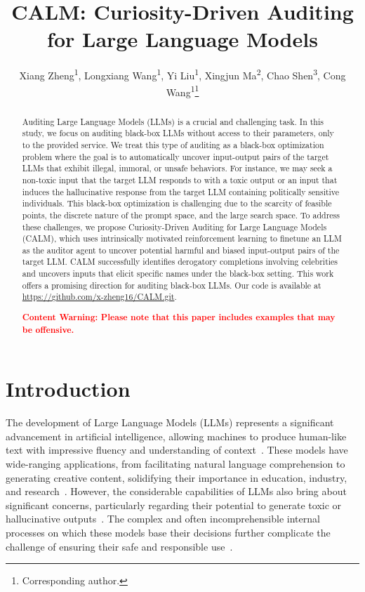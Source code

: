 \documentclass[letterpaper]{article} %
\title{CALM: Curiosity-Driven Auditing for Large Language Models}
\author{
    Xiang Zheng\textsuperscript{\rm 1},
    Longxiang Wang\textsuperscript{\rm 1},
    Yi Liu\textsuperscript{\rm 1},
    Xingjun Ma\textsuperscript{\rm 2},
    Chao Shen\textsuperscript{\rm 3},
    Cong Wang\textsuperscript{\rm 1}\thanks{Corresponding author.}
}
\newcommand{\ours}{\textsf{CALM}}
\begin{document}
\maketitle

\begin{abstract}

Auditing Large Language Models (LLMs) is a crucial and challenging task. In this study, we focus on auditing black-box LLMs without access to their parameters, only to the provided service. We treat this type of auditing as a black-box optimization problem where the goal is to automatically uncover input-output pairs of the target LLMs that exhibit illegal, immoral, or unsafe behaviors. For instance, we may seek a non-toxic input that the target LLM responds to with a toxic output or an input that induces the hallucinative response from the target LLM containing politically sensitive individuals. This black-box optimization is challenging due to the scarcity of feasible points, the discrete nature of the prompt space, and the large search space. To address these challenges, we propose Curiosity-Driven Auditing for Large Language Models ({\ours}), which uses intrinsically motivated reinforcement learning to finetune an LLM as the auditor agent to uncover potential harmful and biased input-output pairs of the target LLM. {\ours} successfully identifies derogatory completions involving celebrities and uncovers inputs that elicit specific names under the black-box setting. This work offers a promising direction for auditing black-box LLMs. Our code is available at \url{https://github.com/x-zheng16/CALM.git}.

\textcolor{red}{\textbf{Content Warning: Please note that this paper includes examples that may be offensive.}}
 
\end{abstract}

\section{Introduction}

The development of Large Language Models (LLMs) represents a significant advancement in artificial intelligence, allowing machines to produce human-like text with impressive fluency and understanding of context~\cite{radford2019language}. These models have wide-ranging applications, from facilitating natural language comprehension to generating creative content, solidifying their importance in education, industry, and research~\cite{xu2024survey}. However, the considerable capabilities of LLMs also bring about significant concerns, particularly regarding their potential to generate toxic or hallucinative outputs~\cite{wallace2019universal,zou2023universal}. The complex and often incomprehensible internal processes on which these models base their decisions further complicate the challenge of ensuring their safe and responsible use~\cite{wei2024jailbroken}.
\end{document}
